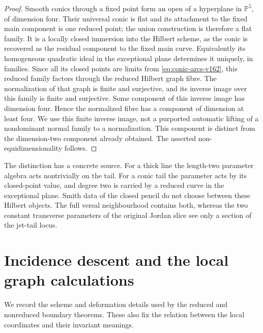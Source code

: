 \documentclass[11pt,reqno]{amsart}
\numberwithin{equation}{section}
\theoremstyle{definition}\newtheorem{definition}[theorem]{Definition}
\theoremstyle{remark}\newtheorem{remark}[theorem]{Remark}
\newcommand{\Pj}{\mathbb P}\newcommand{\A}{\mathbb A}
\begin{document}
\begin{proof}
Smooth conics through a fixed point form an open of a hyperplane
in $\Pj^5$, of dimension four. Their universal conic is flat and
its attachment to the fixed main component is one reduced point;
the union construction is therefore a flat family. It is a locally
closed immersion into the Hilbert scheme, as the conic is recovered
as the residual component to the fixed main curve. Equivalently its
homogeneous quadratic ideal in the exceptional plane determines it
uniquely, in families. Since all its closed points are limits from
\eqref{eq:conic-arcs-v162}, this reduced family factors through the
reduced Hilbert graph fibre. The normalization of that graph is
finite and surjective, and its inverse image over this family is
finite and surjective. Some component of this inverse image has
dimension four. Hence the normalized fibre has a component of
dimension at least four. We use this finite inverse image, not a
purported automatic lifting of a nondominant normal family to a
normalization. This component is distinct from the dimension-two
component already obtained. The asserted non-equidimensionality
follows.
\end{proof}

The distinction has a concrete source. For a thick line the length-two
parameter algebra acts nontrivially on the tail. For a conic tail the
parameter acts by its closed-point value, and degree two is carried
by a reduced curve in the exceptional plane. Smith data of the closed
pencil do not choose between these Hilbert objects. The full versal
neighbourhood contains both, whereas the two constant transverse
parameters of the original Jordan slice see only a section of the
jet-tail locus.

\section{Incidence descent and the local graph calculations}
\label{sec:technical-completions-v162}
We record the scheme and deformation details used by the reduced and
nonreduced boundary theorems. These also fix the relation between the
local coordinates and their invariant meanings.
\end{document}
